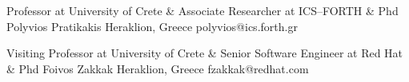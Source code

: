


\begin{cventries}

  \cventry
    {Professor at University of Crete \& Associate Researcher at ICS--FORTH \& Phd} %
    {Polyvios Pratikakis} %
    {Heraklion, Greece} %
    {} %
    {
        polyvios@ics.forth.gr
    }

  \cventry
    {Visiting Professor at University of Crete \& Senior Software Engineer at Red Hat \& Phd} %
    {Foivos Zakkak} %
    {Heraklion, Greece} %
    {} %
    {
        fzakkak@redhat.com
    }

\end{cventries}
